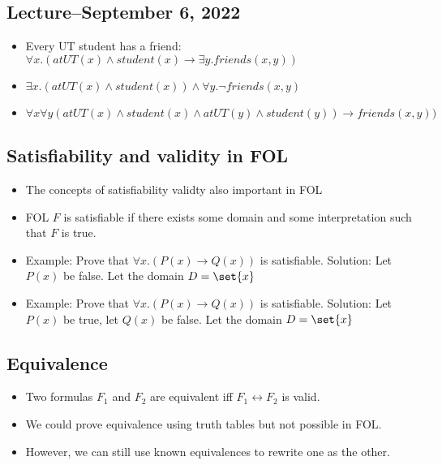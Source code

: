 \documentclass[8pt]{scrreprt}
\begin{document}
\begin{landscape}
\begin{multicols*}{3}
\section{Lecture--September 6, 2022}

\begin{example}
	\begin{itemize}
		\item Every UT student has a friend: $\forall x.(atUT(x)\land student(x)\rightarrow \exists y.friends(x, y))$
		\item $\exists x.(atUT(x)\land student(x))\land \forall y. \neg friends(x, y)$
		\item $\forall x \forall y (atUT(x)\land student(x) \land atUT(y)\land student(y)) \rightarrow friends(x, y))$
	\end{itemize}
\end{example}

\subsection{Satisfiability and validity in FOL}

\begin{itemize}
	\item The concepts of satisfiability validty also important in FOL
	\item FOL $F$ is satisfiable if there exists some domain and some interpretation such that $F$ is true.
	\item Example: Prove that $\forall x.(P(x)\rightarrow Q(x))$ is satisfiable. Solution:
	      Let $P(x)$ be false. Let the domain $D = \set{x}$
	\item Example: Prove that $\forall x.(P(x)\rightarrow Q(x))$ is satisfiable. Solution:
	      Let $P(x)$ be true, let $Q(x)$ be false. Let the domain $D = \set{x}$
\end{itemize}

\subsection{Equivalence}
\begin{itemize}
	\item Two formulas $F_1$ and $F_2$ are equivalent iff $F_1\leftrightarrow F_2$ is valid.
	\item We could prove equivalence using truth tables but not possible in FOL.
	\item However, we can still use known equivalences to rewrite one as the other.
\end{itemize}


\end{multicols*}
\end{landscape}
\end{document}
